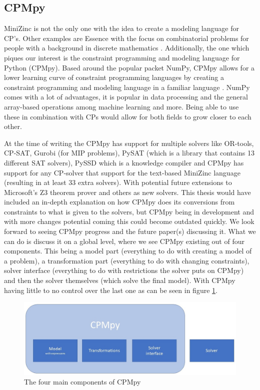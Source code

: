 \subsection{CPMpy}
\label{CP:CPMpy}
MiniZinc is not the only one with the idea to create a modeling language for CP's. Other examples are Essence with the focus on combinatorial problems for people with a background in discrete mathematics \cite{70frisch2008essence}.
Additionally, the one which piques our interest is the constraint programming and modeling language for Python (CPMpy). Based around the popular packet NumPy, CPMpy allows for a lower learning curve of constraint programming languages by creating a constraint programming and modeling language in a familiar language \cite{17guns2019increasing}. NumPy comes with a lot of advantages, it is popular in data processing and the general array-based operations among machine learning and more. 
Being able to use these in combination with CPs would allow for both fields to grow closer to each other. 


At the time of writing the CPMpy has support for multiple solvers like OR-tools, CP-SAT, Gurobi (for MIP problems), PySAT (which is a library that contains 13 different SAT solvers), PySSD which is a knowledge compiler and CPMpy has support for any CP-solver that support for the text-based MiniZinc language \cite{CPMpyDoc, CPMpyGithub} (resulting in at least 33 extra solvers). With potential future extensions to Microsoft's Z3 theorem prover and others as new solvers.
This thesis would have included an in-depth explanation on how CPMpy does its conversions from constraints to what is given to the solvers, but CPMpy being in development and with more changes potential coming this could become outdated quickly. We look forward to seeing CPMpy progress and the future paper(s) discussing it. What we can do is discuss it on a global level, where we see CPMpy existing out of four components. This being a model part (everything to do with creating a model of a problem), a transformation part (everything to do with changing constraints), solver interface (everything to do with restrictions the solver puts on CPMpy) and then the solver themselves (which solve the final model). With CPMpy having little to no control over the last one as can be seen in figure \ref{fig:4ComponentsOfCPMpy}.

\begin{figure}
	\centering
	\includegraphics[width=1.0\textwidth]{images/4componentsOfCPMpy}
	\caption{The four main components of CPMpy}
	\label{fig:4ComponentsOfCPMpy}
\end{figure}

